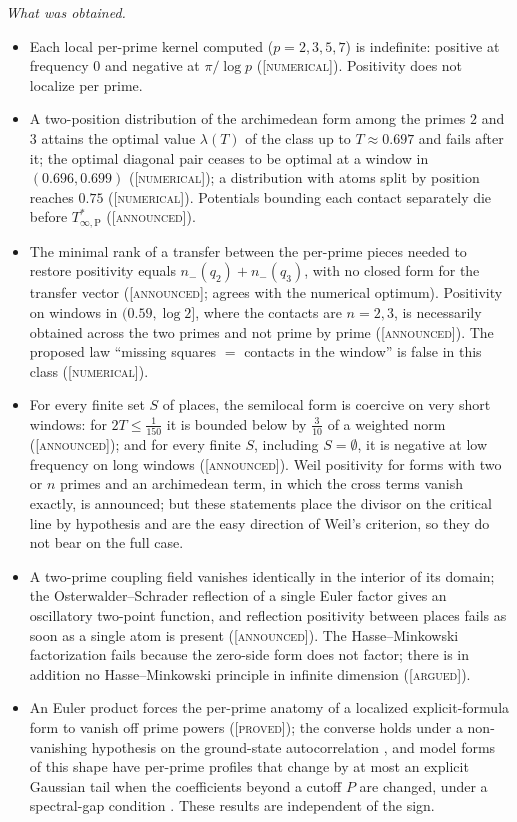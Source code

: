 \documentclass[11pt]{amsart}
\theoremstyle{definition}
\theoremstyle{remark}
\numberwithin{equation}{section}
\newcommand{\lam}{\lambda(T)}                          %
\newcommand{\Tarch}{T^{*}_{\infty,\mathrm P}}          %
\newcommand{\stag}[1]{\textsc{[#1]}}
\newcommand{\PROVED}{\stag{proved}}
\newcommand{\ARGUED}{\stag{argued}}
\newcommand{\NUM}{\stag{numerical}}
\newcommand{\ANNOUNCED}{\stag{announced}}
\newcommand{\entry}[1]{\par\smallskip\noindent\textit{#1.}\enspace}
\begin{document}
\entry{What was obtained}
\begin{itemize}
\item Each local per-prime kernel computed ($p=2,3,5,7$) is indefinite: positive at frequency $0$ and negative at $\pi/\log p$
(\NUM). Positivity does not localize per prime.
\item A two-position distribution of the archimedean form among the primes $2$ and $3$ attains the optimal value $\lam$ of the class up to $T\approx0.697$
and fails after it; the optimal diagonal pair ceases to be optimal at a window in $(0.696,0.699)$ (\NUM); a distribution with atoms
split by position reaches $0.75$ (\NUM). Potentials bounding each contact separately die before $\Tarch$ (\ANNOUNCED).
\item The minimal rank of a transfer between the per-prime pieces needed to restore positivity equals $n_-(q_2)+n_-(q_3)$, with no
closed form for the transfer vector (\ANNOUNCED; agrees with the numerical optimum). Positivity on windows in $(0.59,\log2]$, where the
contacts are $n=2,3$, is necessarily obtained across the two primes and not prime by prime (\ANNOUNCED). The proposed law ``missing
squares $=$ contacts in the window'' is false in this class (\NUM).
\item For every finite set $S$ of places, the semilocal form is coercive on very short windows: for $2T\le\frac1{150}$ it is bounded
below by $\frac3{10}$ of a weighted norm (\ANNOUNCED); and for every finite $S$, including $S=\emptyset$, it is negative at low
frequency on long windows (\ANNOUNCED). Weil positivity for forms with two or $n$ primes and an archimedean term, in which the cross
terms vanish exactly, is announced; but these statements place the divisor on the critical line by hypothesis and are the easy
direction of Weil's criterion, so they do not bear on the full case.
\item A two-prime coupling field vanishes identically in the interior of its domain; the Osterwalder--Schrader reflection of a single
Euler factor gives an oscillatory two-point function, and reflection positivity between places fails as soon as a single atom is present
(\ANNOUNCED). The Hasse--Minkowski factorization fails because the zero-side form does not factor; there is in addition no
Hasse--Minkowski principle in infinite dimension (\ARGUED).
\item An Euler product forces the per-prime anatomy of a localized explicit-formula form to vanish off prime powers
\cite[Theorem~3.1]{P10} (\PROVED); the converse holds under a non-vanishing hypothesis on the ground-state autocorrelation \cite[Theorems~5.1--5.2]{P10},
and model forms of this shape have per-prime profiles that change by at most an explicit Gaussian tail when the coefficients beyond a cutoff $P$ are changed, under a spectral-gap condition \cite[Theorem~4.1]{P09}.
These results are independent of the sign.
\end{itemize}
\end{document}
